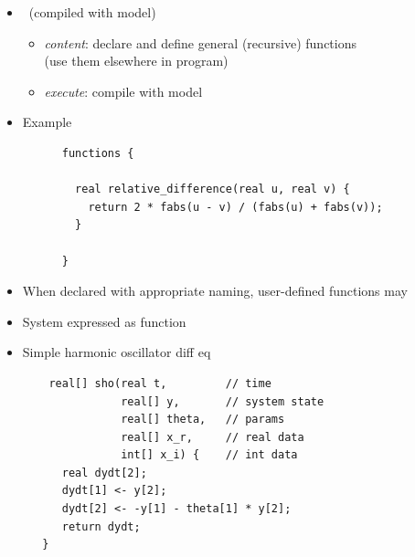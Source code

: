 \documentclass[10pt]{report}
\begin{document}
%
\begin{itemize}
\item {} \ (compiled with model)
  \vspace*{-4pt}
  \begin{itemize}\small
  \item {\slshape content}: declare and define general (recursive) functions
    \\
    {\small (use them elsewhere in program)}
  \item {\slshape execute}: compile with model
  \end{itemize}
  \vspace*{6pt}
\item Example
  \\[6pt]
  \begin{minipage}[t]{0.8\textwidth}
    \footnotesize
    \begin{Verbatim}
      functions {

        real relative_difference(real u, real v) {
          return 2 * fabs(u - v) / (fabs(u) + fabs(v));
        }

      }
    \end{Verbatim}
  \end{minipage}
\end{itemize}


%
\begin{itemize}
\item When declared with appropriate naming, user-defined functions
  may
\end{itemize}


%
\begin{itemize}
\item System expressed as function
\item Simple harmonic oscillator diff eq
{\footnotesize
\begin{Verbatim}
    real[] sho(real t,         // time
               real[] y,       // system state
               real[] theta,   // params
               real[] x_r,     // real data
               int[] x_i) {    // int data
      real dydt[2];
      dydt[1] <- y[2];
      dydt[2] <- -y[1] - theta[1] * y[2];
      return dydt;
   }
\end{Verbatim}
}
\end{itemize}
\end{document}
